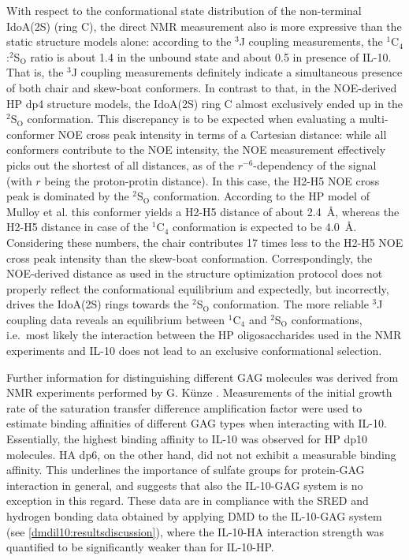 With respect to the conformational state distribution of the non-terminal
IdoA(2S) (ring C), the direct NMR measurement also is more expressive than the
static structure models alone: according to the ${}^{3}$J coupling measurements,
the ${}^1$C${}_4$:${}^2$S${}_\mathrm{O}$ ratio is about 1.4 in the unbound state
and about 0.5 in presence of IL-10. That is, the ${}^{3}$J coupling measurements
definitely indicate a simultaneous presence of both chair and skew-boat
conformers. In contrast to that, in the NOE-derived HP dp4 structure models, the
IdoA(2S) ring C almost exclusively ended up in the  ${}^2$S${}_\mathrm{O}$
conformation. This discrepancy is to be expected when evaluating a
multi-conformer NOE cross peak intensity in terms of a Cartesian distance: while
all conformers contribute to the NOE intensity, the NOE measurement effectively
picks out the shortest of all distances, as of the $r^{-6}$-dependency of the
signal (with $r$ being the proton-protin distance). In this case, the H2-H5 NOE
cross peak is dominated by the ${}^2$S${}_\mathrm{O}$ conformation. According to
the HP model of Mulloy et al. \cite{foster_mulloy_1993} this conformer yields a
H2-H5 distance of about \SI{2.4}{\angstrom}, whereas the H2-H5 distance in case
of the ${}^1$C${}_4$ conformation is expected to be \SI{4.0}{\angstrom}.
Considering these numbers, the chair contributes 17 times less to the H2-H5 NOE
cross peak intensity than the skew-boat conformation. Correspondingly, the
NOE-derived distance as used in the structure optimization protocol does not
properly reflect the conformational equilibrium and expectedly, but incorrectly,
drives the IdoA(2S) rings towards the ${}^2$S${}_\mathrm{O}$ conformation. The
more reliable ${}^{3}$J coupling data reveals an equilibrium between
${}^1$C${}_4$ and ${}^2$S${}_\mathrm{O}$ conformations, i.e.\ most likely the
interaction between the HP oligosaccharides used in the NMR experiments and
IL-10 does not lead to an exclusive conformational selection.

Further information for distinguishing different GAG molecules was derived from
NMR experiments performed by G. Künze \cite{kuenze_gehrcke_2014}. Measurements
of the initial growth rate of the saturation transfer difference amplification
factor were used to estimate binding affinities of different GAG types when
interacting with IL-10. Essentially, the highest binding affinity to IL-10 was
observed for HP dp10 molecules. HA dp6, on the other hand, did not not exhibit a
measurable binding affinity. This underlines the importance of sulfate groups
for protein-GAG interaction in general, and suggests that also the IL-10-GAG
system is no exception in this regard. These data are in compliance with the
SRED and hydrogen bonding data obtained by applying DMD to the IL-10-GAG system
(see \cref{dmdil10:resultsdiscussion}), where the IL-10-HA interaction strength
was quantified to be significantly weaker than for IL-10-HP.

